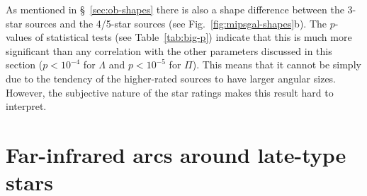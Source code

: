 \documentclass[useAMS, usenatbib, a4paper]{mnras}
\begin{document}
As mentioned in \S~\ref{sec:ob-shapes} there is also a shape
difference between the 3-star sources and the 4/5-star sources (see
Fig.~\ref{fig:mipsgal-shapes}b).  The \(p\)-values of statistical
tests (see Table~\ref{tab:big-p}) indicate that this is much more
significant than any correlation with the other parameters discussed
in this section (\(p < 10^{-4}\) for \(\Lambda\) and \(p < 10^{-5}\) for
\(\Pi\)).  This means that it cannot be simply due to the tendency of
the higher-rated sources to have larger angular sizes.  However, the
subjective nature of the star ratings makes this result hard to
interpret.

\section{Far-infrared arcs around late-type stars}
\label{sec:far-infrared-arcs}
\end{document}
